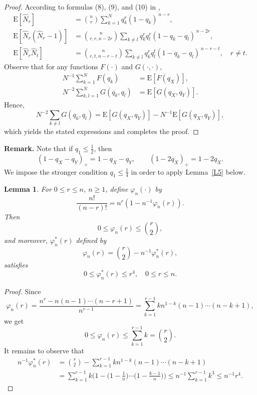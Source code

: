 \documentclass[12]{article}
\newtheorem{lemma}{Lemma} %
\newcommand{\rE}{\mathrm{E}} %
\begin{document}
\begin{proof}
According to formulas (8), (9), and (10) in \cite[Ch.~III.1]{KSC},
\begin{align*}
\rE[\hat N_r]
&= \binom{n}{r}\sum_{k=1}^N q_k^r(1-q_k)^{\,n-r},\\
\rE[\hat N_r(\hat N_r-1)]
&= \binom{n}{r,r,n-2r}
   \sum_{k\ne l} q_k^r q_l^r(1-q_k-q_l)^{\,n-2r},\\
\rE[\hat N_r \hat N_t]
&= \binom{n}{r,t,n-r-t}
   \sum_{k\ne l} q_k^r q_l^t(1-q_k-q_l)^{\,n-r-t},\quad r \ne t.
\end{align*}
Observe that for any functions $F(\cdot)$ and $G(\cdot,\cdot)$,
\begin{align*}
N^{-1}\sum_{k=1}^N F(q_k) &= \rE[F(q_X)], \\
N^{-2}\sum_{k,l=1}^N G(q_k,q_l) &= \rE[G(q_X,q_Y)].
\end{align*}
Hence,
\[
N^{-2}\sum_{k\ne l} G(q_k,q_l)
= \rE[G(q_X,q_Y)] - N^{-1} \rE[G(q_X,q_Y)],
\]
which yields the stated expressions and completes the proof.
\end{proof}


\noindent\textbf{Remark.} Note that if $q_1 \le \tfrac{1}{2}$, then
\[
(1-q_X-q_Y)_+ = 1-q_X-q_Y, \qquad (1-2q_X)_+ = 1-2q_X.
\]
We impose the stronger condition $q_1 \le \tfrac{1}{4}$ in order to apply Lemma~\ref{L5} below.


\begin{lemma}\label{L4}
 For $0\le r\le n$, $n\ge1$, define $\varphi_n(\cdot)$  by
\[ \frac{n!}{(n-r)!}=n^r (1-n^{-1}\varphi_n(r)).\]
Then
\[ 0\le \varphi_n(r)\le \binom{r}{2},\]
and moreover, $\varphi^*_n(r)$ defined by
\[ \varphi_n(r)=\binom{r}{2}-n^{-1}\varphi^*_n(r),\]
satisfies
\[  0\le \varphi^*_n(r)\le r^4,\quad 0\le r\le n.\]
\end{lemma}

\begin{proof} 
Since
 \[\varphi_n(r)=\frac{n^{r}-n(n-1)\cdots(n-r+1)}{n^{r-1}}=\sum_{k=1}^{r-1} kn^{1-k}(n-1)\cdots(n-k+1), \]
we get
 \[0\le \varphi_n(r)\le \sum_{k=1}^{r-1} k=\binom{r}{2}.\]
 It remains to observe that
\begin{align*}
n^{-1}\varphi^*_n(r)&=\binom{r}{2}-\sum_{k=1}^{r-1} kn^{1-k}(n-1)\cdots(n-k+1)\\
&=\sum_{k=1}^{r-1} k\Big(1-\big(1-\tfrac{1}{n}\big)\cdots\big(1-\tfrac{k-1}{n}\big)\Big)\le n^{-1} \sum_{k=1}^{r-1} k^3\le n^{-1}r^4.
\end{align*}

 \end{proof}
\end{document}
